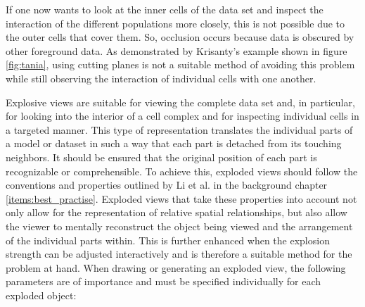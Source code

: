 If one now wants to look at the inner cells of the data set and inspect the interaction of the different populations more closely, this is not possible due to the outer cells that cover them. 
So, occlusion occurs because data is obscured by other foreground data.
As demonstrated by Krisanty's example shown in figure \ref{fig:tania}, using cutting planes is not a suitable method of avoiding this problem while still observing the interaction of individual cells with one another.

Explosive views are suitable for viewing the complete data set and, in particular, for looking into the interior of a cell complex and for inspecting individual cells in a targeted manner. 
This type of representation translates the individual parts of a model or dataset in such a way that each part is detached from its touching neighbors.
It should be ensured that the original position of each part is recognizable or comprehensible. 
To achieve this, exploded views should follow the conventions and properties outlined by Li et al. in the background chapter \ref{items:best_practise}.
Exploded views that take these properties into account not only allow for the representation of relative spatial relationships, but also allow the viewer to mentally reconstruct the object being viewed and the arrangement of the individual parts within. 
This is further enhanced when the explosion strength can be adjusted interactively and is therefore a suitable method for the problem at hand.
When drawing or generating an exploded view, the following parameters are of importance and must be specified individually for each exploded object:
